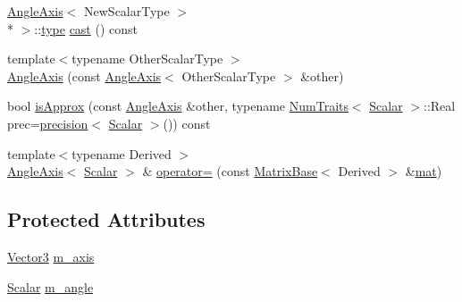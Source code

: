 \begin{DoxyCompactItemize}
\hyperlink{class_angle_axis}{Angle\-Axis}$<$ New\-Scalar\-Type $>$\\*
 $>$\-::\hyperlink{glext_8h_a7d05960f4f1c1b11f3177dc963a45d86}{type} \hyperlink{class_angle_axis_aa5ae09ae4167492345916e5ca0b09361}{cast} () const 
\item 
{\footnotesize template$<$typename Other\-Scalar\-Type $>$ }\\\hyperlink{class_angle_axis_a414a5b324c5461f6b5635cb6a6bc7eff}{Angle\-Axis} (const \hyperlink{class_angle_axis}{Angle\-Axis}$<$ Other\-Scalar\-Type $>$ \&other)
\item 
bool \hyperlink{class_angle_axis_a0e0c5e2524d8b5fe423f0a574ab1cf94}{is\-Approx} (const \hyperlink{class_angle_axis}{Angle\-Axis} \&other, typename \hyperlink{struct_num_traits}{Num\-Traits}$<$ \hyperlink{class_angle_axis_a6b92671c4ba67e688117dfb93215a895}{Scalar} $>$\-::Real prec=\hyperlink{_math_functions_8h_a3dc1c65cf9dc9b5a7ee66472d0ae83e1}{precision}$<$ \hyperlink{class_angle_axis_a6b92671c4ba67e688117dfb93215a895}{Scalar} $>$()) const 
\item 
{\footnotesize template$<$typename Derived $>$ }\\\hyperlink{class_angle_axis}{Angle\-Axis}$<$ \hyperlink{class_angle_axis_a6b92671c4ba67e688117dfb93215a895}{Scalar} $>$ \& \hyperlink{class_angle_axis_a8199f7d002af3cf09b4990d9eb8c0d0d}{operator=} (const \hyperlink{class_matrix_base}{Matrix\-Base}$<$ Derived $>$ \&\hyperlink{uavobjecttemplate_8m_a16a51e808b16c46bbfd36da2e37cd123}{mat})
\end{DoxyCompactItemize}
\subsection*{Protected Attributes}
\begin{DoxyCompactItemize}
\item 
\hyperlink{class_angle_axis_a56196b7afb477e4f60bc8819cf63c6ec}{Vector3} \hyperlink{class_angle_axis_a86b1966a598bae82663a6035f8c29916}{m\-\_\-axis}
\item 
\hyperlink{class_angle_axis_a6b92671c4ba67e688117dfb93215a895}{Scalar} \hyperlink{class_angle_axis_a5cdef41ffecf99deb1a6b7d647a66433}{m\-\_\-angle}
\end{DoxyCompactItemize}
